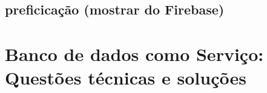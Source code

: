 	\subsection{preficicação (mostrar do Firebase)}

\section{Banco de dados como Serviço: Questões técnicas e soluções}
